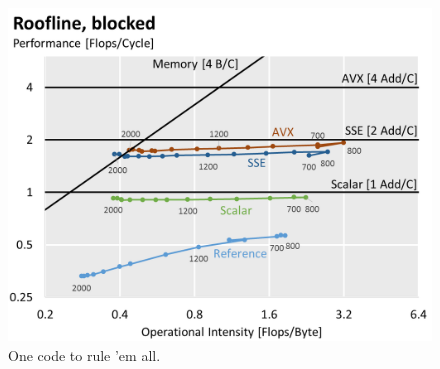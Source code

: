 \begin{figure}[htb]\centering
  \includegraphics[width=\linewidth]{roofline-data/roofline_blocked.png}
  \caption{One code to rule 'em all.}
  \label{fig:roofline-blocked}
\end{figure}
